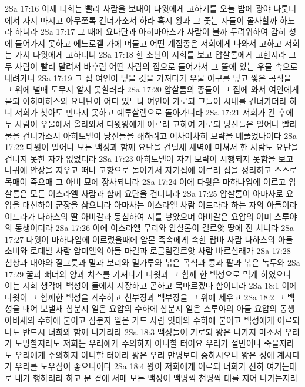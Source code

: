 2Sa 17:16  이제 너희는 빨리 사람을 보내어 다윗에게 고하기를 오늘 밤에 광야 나룻터에서 자지 마시고 아무쪼록 건너가소서 하라 혹시 왕과 그 좇는 자들이 몰사할까 하노라 하니라
2Sa 17:17  그 때에 요나단과 아히마아스가 사람이 볼까 두려워하여 감히 성에 들어가지 못하고 에느로겔 가에 머물고 어떤 계집종은 저희에게 나와서 고하고 저희는 가서 다윗에게 고하더니
2Sa 17:18  한 소년이 저희를 보고 압살롬에게 고한지라 그 두 사람이 빨리 달려서 바후림 어떤 사람의 집으로 들어가서 그 뜰에 있는 우물 속으로 내려가니
2Sa 17:19  그 집 여인이 덮을 것을 가져다가 우물 아구를 덮고 찧은 곡식을 그 위에 널매 도무지 알지 못할러라
2Sa 17:20  압살롬의 종들이 그 집에 와서 여인에게 묻되 아히마하스와 요나단이 어디 있느냐 여인이 가로되 그들이 시내를 건너가더라 하니 저희가 찾아도 만나지 못하고 예루살렘으로 돌아가니라
2Sa 17:21  저희가 간 후에 두 사람이 우물에서 올라와서 다윗왕에게 이르러 고하여 가로되 당신들은 일어나 빨리 물을 건너가소서 아히도벨이 당신들을 해하려고 여차여차히 모략을 베풀었나이다
2Sa 17:22  다윗이 일어나 모든 백성과 함께 요단을 건널새 새벽에 미쳐서 한 사람도 요단을 건너지 못한 자가 없었더라
2Sa 17:23  아히도벨이 자기 모략이 시행되지 못함을 보고 나귀에 안장을 지우고 떠나 고향으로 돌아가서 자기집에 이르러 집을 정리하고 스스로 목매어 죽으매 그 아비 묘에 장사되니라
2Sa 17:24  이에 다윗은 마하나임에 이르고 압살롬은 모든 이스라엘 사람과 함께 요단을 건너니라
2Sa 17:25  압살롬이 아마사로 요압을 대신하여 군장을 삼으니라 아마사는 이스라엘 사람 이드라라 하는 자의 아들이라 이드라가 나하스의 딸 아비갈과 동침하여 저를 낳았으며 아비갈은 요압의 어미 스루야의 동생이더라
2Sa 17:26  이에 이스라엘 무리와 압살롬이 길르앗 땅에 진 치니라
2Sa 17:27  다윗이 마하나임에 이르렀을때에 암몬 족속에게 속한 랍바 사람 나하스의 아들 소비와 로데발 사람 암미엘의 아들 마길과 로글림길르앗 사람 바르실래가
2Sa 17:28  침상과 대야와 질그릇과 밀과 보리와 밀가루와 볶은 곡식과 콩과 팥과 볶은 녹두와
2Sa 17:29  꿀과 뻐더와 양과 치스를 가져다가 다윗과 그 함께 한 백성으로 먹게 하였으니 이는 저희 생각에 백성이 들에서 시장하고 곤하고 목마르겠다 함이더라
2Sa 18:1  이에 다윗이 그 함께한 백성을 계수하고 천부장과 백부장을 그 위에 세우고
2Sa 18:2  그 백성을 내어 보낼새 삼분지 일은 요압의 수하에 삼분지 일은 스루야의 아들 요압의 동생 아비새의 수하에 붙이고 삼분지 일은 가드 사람 잇대의 수하에 붙이고 백성에게 이르되 나도 반드시 너희와 함께 나가리라
2Sa 18:3  백성들이 가로되 왕은 나가지 마소서 우리가 도망할지라도 저희는 우리에게 주의하지 아니할 터이요 우리가 절반이나 죽을지라도 우리에게 주의하지 아니할 터이라 왕은 우리 만명보다 중하시오니 왕은 성에 계시다가 우리를 도우심이 좋으니이다
2Sa 18:4  왕이 저희에게 이르되 너희가 선히 여기는대로 내가 행하리라 하고 문 곁에 서매 모든 백성이 백명씩 천명씩 대를 지어 나가는지라
